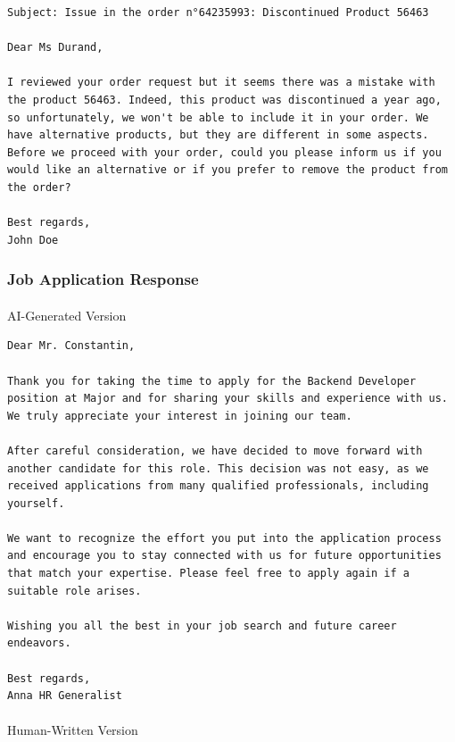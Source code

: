 \documentclass[
  letterpaper,
  DIV=11,
  numbers=noendperiod]{scrartcl}
\makeatletter
\let\oldparagraph\paragraph
\renewcommand{\paragraph}{
    \@ifstar
      \xxxParagraphStar
      \xxxParagraphNoStar
  }
\newcommand{\xxxParagraphStar}[1]{\oldparagraph*{#1}\mbox{}}
\newcommand{\xxxParagraphNoStar}[1]{\oldparagraph{#1}\mbox{}}
\makeatother
\begin{document}
\begin{verbatim}
Subject: Issue in the order n°64235993: Discontinued Product 56463

Dear Ms Durand,

I reviewed your order request but it seems there was a mistake with the product 56463. Indeed, this product was discontinued a year ago, so unfortunately, we won't be able to include it in your order. We have alternative products, but they are different in some aspects.
Before we proceed with your order, could you please inform us if you would like an alternative or if you prefer to remove the product from the order?

Best regards,
John Doe
\end{verbatim}

\subsubsection{Job Application Response}\label{job-application-response}

\paragraph{AI-Generated Version}\label{ai-generated-version-2}

\begin{verbatim}
Dear Mr. Constantin,

Thank you for taking the time to apply for the Backend Developer position at Major and for sharing your skills and experience with us. We truly appreciate your interest in joining our team.

After careful consideration, we have decided to move forward with another candidate for this role. This decision was not easy, as we received applications from many qualified professionals, including yourself.

We want to recognize the effort you put into the application process and encourage you to stay connected with us for future opportunities that match your expertise. Please feel free to apply again if a suitable role arises.

Wishing you all the best in your job search and future career endeavors.

Best regards,
Anna HR Generalist
\end{verbatim}

\paragraph{Human-Written Version}\label{human-written-version-2}
\end{document}
